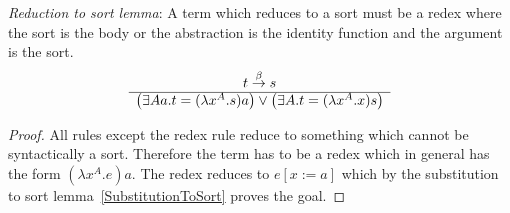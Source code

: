 \begin{lemma}
    \emph{Reduction to sort lemma}: A term which reduces to a sort must be a
    redex where the sort is the body or the abstraction is the identity function
    and the argument is the sort.
    $$
    \begin{array}{c} 
        t \stackrel{\beta}{\to} s
     \\ \hline 
        \left(
            \exists Aa. t = (\lambda x^A. s) a
        \right)
        \lor
        \left(
            \exists A. t =(\lambda x^A. x) s
        \right)
    \end{array}
    $$

    \begin{proof}
        All rules except the redex rule reduce to something which cannot be
        syntactically a sort. Therefore the term has to be a redex which in
        general has the form $(\lambda x^A.e) a$. The redex reduces to $e[x:=a]$
        which by the substitution to sort lemma~\ref{SubstitutionToSort} proves
        the goal.
    \end{proof}
\end{lemma}


